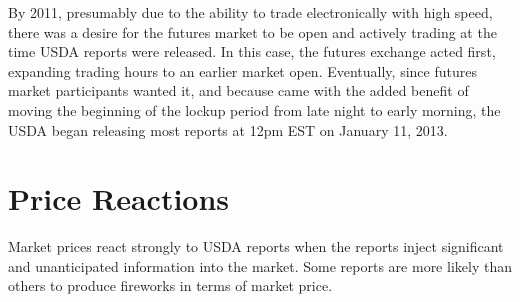 \documentclass[
  letterpaper,
  DIV=11,
  numbers=noendperiod]{scrreprt}
\begin{document}
By 2011, presumably due to the ability to trade electronically with high
speed, there was a desire for the futures market to be open and actively
trading at the time USDA reports were released. In this case, the
futures exchange acted first, expanding trading hours to an earlier
market open. Eventually, since futures market participants wanted it,
and because came with the added benefit of moving the beginning of the
lockup period from late night to early morning, the USDA began releasing
most reports at 12pm EST on January 11, 2013.

\hypertarget{price-reactions-1}{%
\section{Price Reactions}\label{price-reactions-1}}

Market prices react strongly to USDA reports when the reports inject
significant and unanticipated information into the market. Some reports
are more likely than others to produce fireworks in terms of market
price.
\end{document}
